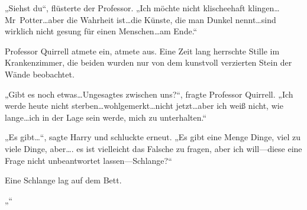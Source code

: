 „Siehst du“, flüsterte der Professor. „Ich möchte nicht klischeehaft klingen…Mr~Potter…aber die Wahrheit ist…die Künste, die man Dunkel nennt…sind wirklich nicht gesung für einen Menschen…am Ende.“

Professor Quirrell atmete ein, atmete aus.
Eine Zeit lang herrschte Stille im Krankenzimmer, die beiden wurden nur von dem kunstvoll verzierten Stein der Wände beobachtet.

„Gibt es noch etwas…Ungesagtes zwischen uns?“, fragte Professor Quirrell. „Ich werde heute nicht sterben…wohlgemerkt…nicht jetzt…aber ich weiß nicht, wie lange…ich in der Lage sein werde, mich zu unterhalten.“

„Es gibt…“, sagte Harry und schluckte erneut.
„Es gibt eine Menge Dinge, viel zu viele Dinge, aber…. es ist vielleicht das Falsche zu fragen, aber ich will—diese eine Frage nicht unbeantwortet lassen—Schlange?“

Eine Schlange lag auf dem Bett.

„“

